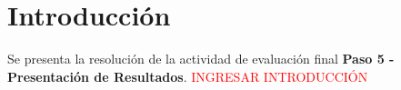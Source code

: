 \section*{Introducci\'on}
	Se presenta la resoluci\'on de la actividad de evaluación final \textbf{Paso 5 - Presentación de Resultados}. \textcolor{red}{INGRESAR INTRODUCCIÓN}
\newpage